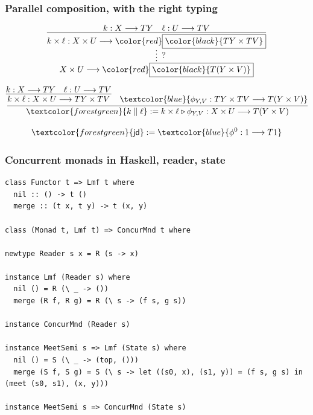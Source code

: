 \documentclass[aspectratio=169,11pt]{beamer}
\newcommand{\tto}{\longrightarrow}
\newcommand{\seq}{\mathbin{\triangleright}}
\newcommand{\jd}{\mathsf{jd}}
\newcommand{\prl}{\parallel}
\newcommand{\emb}[1]{\textcolor{forestgreen}{#1}}
\newcommand{\redb}[1]{{\color{red}\boxed{\color{black}{#1}}}}
\newcommand{\blue}[1]{\textcolor{blue}{#1}}
\begin{document}
\begin{frame}

\frametitle{Parallel composition, with the right typing}

\[
  \infer*[?]{X \times U \tto \redb{T (Y \times V)}}{
    \infer{k \times \ell : X \times U \tto \redb{T Y \times T V}}{
      k : X \tto T Y
      & 
      \ell : U \tto T V
    }  
  }
\]

\[
  \infer{\emb{k \prl \ell} := k \times \ell \seq \phi_{Y,V} : X \times U \tto T (Y \times V)}{
    \infer{k \times \ell : X \times U \tto T Y \times T V}{
      k : X \tto T Y
      & 
      \ell : U \tto T V
    }
    &
    \blue{\phi_{Y,V} : T Y \times T V \tto T (Y \times V)} 
  }
\]

\[
\emb{\jd} := \blue{\phi^0 : 1 \tto T 1}
\]  

\end{frame}
  

\begin{frame}[fragile]

\frametitle{Concurrent monads in Haskell, reader, state}

\scriptsize
\begin{verbatim}
class Functor t => Lmf t where
  nil :: () -> t ()
  merge :: (t x, t y) -> t (x, y)

class (Monad t, Lmf t) => ConcurMnd t where

newtype Reader s x = R (s -> x)

instance Lmf (Reader s) where
  nil () = R (\ _ -> ())
  merge (R f, R g) = R (\ s -> (f s, g s))

instance ConcurMnd (Reader s)

instance MeetSemi s => Lmf (State s) where
  nil () = S (\ _ -> (top, ()))
  merge (S f, S g) = S (\ s -> let ((s0, x), (s1, y)) = (f s, g s) in (meet (s0, s1), (x, y)))    

instance MeetSemi s => ConcurMnd (State s)

\end{verbatim}

\end{frame}
\end{document}
